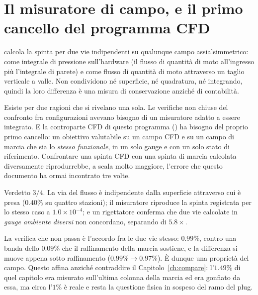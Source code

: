 \section{Il misuratore di campo, e il primo cancello del programma
CFD}
\label{sec:fmeter}

 calcola la spinta per due vie indipendenti
su qualunque campo assialsimmetrico: come integrale di pressione
sull'hardware (il flusso di quantità di moto all'ingresso più
l'integrale di parete) e come flusso di quantità di moto attraverso un
taglio verticale a valle. Non condividono né superficie, né quadratura,
né integrando, quindi la loro differenza è una misura di conservazione
anziché di contabilità.

Esiste per due ragioni che si rivelano una sola. Le verifiche non
chiuse del confronto fra configurazioni avevano bisogno di un
misuratore adatto a essere integrato. E la controparte CFD di questo
programma () ha bisogno del
proprio primo cancello: un obiettivo valutabile su un campo CFD e su
un campo di marcia che sia lo \emph{stesso funzionale}, in un solo
gauge e con un solo stato di riferimento. Confrontare una spinta CFD
con una spinta di marcia calcolata diversamente riprodurrebbe, a scala
molto maggiore, l'errore che questo documento ha ormai incontrato tre
volte.

Verdetto $3/4$. La via del flusso è indipendente dalla superficie
attraverso cui è presa ($0.40\%$ su quattro stazioni); il misuratore
riproduce la spinta registrata per lo stesso caso a
$1.0\times10^{-4}$; e un rigettatore conferma che due vie calcolate in
\emph{gauge ambiente diversi} non concordano, separando di
$5.8\times$.

La verifica che non passa è l'accordo fra le due vie stesso:
$0.99\%$, contro una banda dello $0.09\%$ che il raffinamento della
marcia sostiene, e la differenza si muove appena sotto raffinamento
($0.99\% \to 0.97\%$). È dunque una proprietà del campo. Questo affina
anziché contraddire il Capitolo~\ref{ch:compare}: l'$1.49\%$ di quel
capitolo era misurato sull'ultima colonna della marcia ed era gonfiato
da essa, ma circa l'$1\%$ è reale e resta la questione fisica in
sospeso del ramo del plug.
